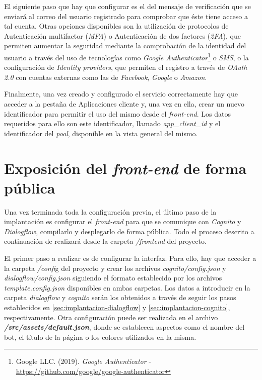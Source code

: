 \documentclass[11pt,spanish,listoffigures]{tfgetsinf}
\begin{document}
El siguiente paso que hay que configurar es el del mensaje de verificación que se enviará al correo del usuario registrado para comprobar que éste tiene acceso a tal cuenta. Otras opciones disponibles son la utilización de protocolos de Autenticación multifactor (\textit{MFA}) o Autenticación de dos factores (\textit{2FA}), que permiten aumentar la seguridad mediante la comprobación de la identidad del usuario a través del uso de tecnologías como \textit{Google Authenticator}\footnote{Google LLC. (2019). \textit{Google Authenticator} - \url{https://github.com/google/google-authenticator}} o \textit{SMS}, o la configuración de \textit{Identity providers}, que permiten el registro a través de \textit{OAuth 2.0} con cuentas externas como las de \textit{Facebook}, \textit{Google} o \textit{Amazon}.

Finalmente, una vez creado y configurado el servicio correctamente hay que acceder a la pestaña de Aplicaciones cliente y, una vez en ella, crear un nuevo identificador para permitir el uso del mismo desde el \textit{front-end}. Los datos requeridos para ello son este identificador, llamado \textit{app\_client\_id} y el identificador del \textit{pool}, disponible en la vista general del mismo.

\section{Exposición del \textit{front-end} de forma pública}
\label{sec:implantacion-frontend}

Una vez terminada toda la configuración previa, el último paso de la implantación es configurar el \textit{front-end} para que se comunique con \textit{Cognito} y \textit{Dialogflow}, compilarlo y desplegarlo de forma pública. Todo el proceso descrito a continuación de realizará desde la carpeta \textit{/frontend} del proyecto.

El primer paso a realizar es de configurar la interfaz. Para ello, hay que acceder a la carpeta \textit{/confi}g del proyecto y crear los archivos \textit{cognito/config.json} y \textit{dialogflow/config.json} siguiendo el formato establecido por los archivos \textit{template.config.json} disponibles en ambas carpetas. Los datos a introducir en la carpeta \textit{dialogflow} y \textit{cognito} serán los obtenidos a través de seguir los pasos establecidos en \ref{sec:implantacion-dialogflow} y \ref{sec:implantacion-cognito}, respectivamente. Otra configuración puede ser realizada en el archivo \textbf{\textit{/src/assets/default.json}}, donde se establecen aspectos como el nombre del bot, el título de la página o los colores utilizados en la misma.
\end{document}
